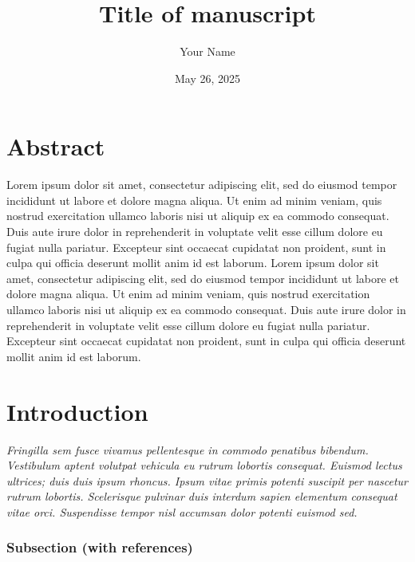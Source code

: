 \documentclass[
  a4paper,
]{scrbook}
\title{Title of manuscript}
\author{Your Name}
\date{May 26, 2025}
\renewcommand*\contentsname{Table of contents}
\newcommand\contentsname{Table of contents}
\begin{document}
\frontmatter
\maketitle

\renewcommand*\contentsname{Table of contents}
{
\setcounter{tocdepth}{1}
\tableofcontents
}

\mainmatter
\chapter{Abstract}\label{abstract}

Lorem ipsum dolor sit amet, consectetur adipiscing elit, sed do eiusmod
tempor incididunt ut labore et dolore magna aliqua. Ut enim ad minim
veniam, quis nostrud exercitation ullamco laboris nisi ut aliquip ex ea
commodo consequat. Duis aute irure dolor in reprehenderit in voluptate
velit esse cillum dolore eu fugiat nulla pariatur. Excepteur sint
occaecat cupidatat non proident, sunt in culpa qui officia deserunt
mollit anim id est laborum. Lorem ipsum dolor sit amet, consectetur
adipiscing elit, sed do eiusmod tempor incididunt ut labore et dolore
magna aliqua. Ut enim ad minim veniam, quis nostrud exercitation ullamco
laboris nisi ut aliquip ex ea commodo consequat. Duis aute irure dolor
in reprehenderit in voluptate velit esse cillum dolore eu fugiat nulla
pariatur. Excepteur sint occaecat cupidatat non proident, sunt in culpa
qui officia deserunt mollit anim id est laborum.

\chapter{Introduction}\label{introduction}

\emph{Fringilla sem fusce vivamus pellentesque in commodo penatibus
bibendum. Vestibulum aptent volutpat vehicula eu rutrum lobortis
consequat. Euismod lectus ultrices; duis duis ipsum rhoncus. Ipsum vitae
primis potenti suscipit per nascetur rutrum lobortis. Scelerisque
pulvinar duis interdum sapien elementum consequat vitae orci.
Suspendisse tempor nisl accumsan dolor potenti euismod sed.}

\subsection{Subsection (with
references)}\label{subsection-with-references}
\end{document}

